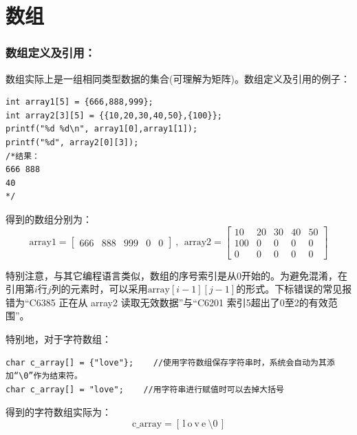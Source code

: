 \documentclass[zihao=-4,UTF8]{report}
\begin{document}
\section{数组}
\subsubsection{数组定义及引用：}
数组实际上是一组相同类型数据的集合(可理解为矩阵)。数组定义及引用的例子：
\begin{lstlisting}
int array1[5] = {666,888,999};
int array2[3][5] = {{10,20,30,40,50},{100}};
printf("%d %d\n", array1[0],array1[1]);
printf("%d", array2[0][3]);
/*结果：
666 888
40
*/
\end{lstlisting}
得到的数组分别为：
\begin{equation*}
    \text{array1} = 
    \begin{bmatrix}
        666&888&999&0&0
    \end{bmatrix}\ ,\ \ 
    \text{array2} = 
    \begin{bmatrix}
       10& 20 & 30 & 40 & 50\\
       100 & 0 & 0 & 0 & 0\\
       0 & 0 & 0 & 0 & 0
    \end{bmatrix}
\end{equation*}\par
特别注意，与其它编程语言类似，数组的序号索引是从0开始的。{\color{gray}\small 为避免混淆，在引用第$i$行$j$列的元素时，可以采用$\text{array}[i-1][j-1]$的形式。下标错误的常见报错为“C6385	正在从 array2 读取无效数据”与“C6201	索引5超出了0至2的有效范围”。}\par
特别地，对于字符数组：
\begin{lstlisting}
char c_array[] = {"love"};    //使用字符数组保存字符串时，系统会自动为其添加“\0”作为结束符。
char c_array[] = "love";    //用字符串进行赋值时可以去掉大括号
\end{lstlisting}
得到的字符数组实际为：
\begin{equation*}
    \text{c\_array} =[\,  \text{l}\ \text{o}\ \text{v}\ \text{e}\ \text{\textbackslash 0}\, ]
\end{equation*}\par
\end{document}
